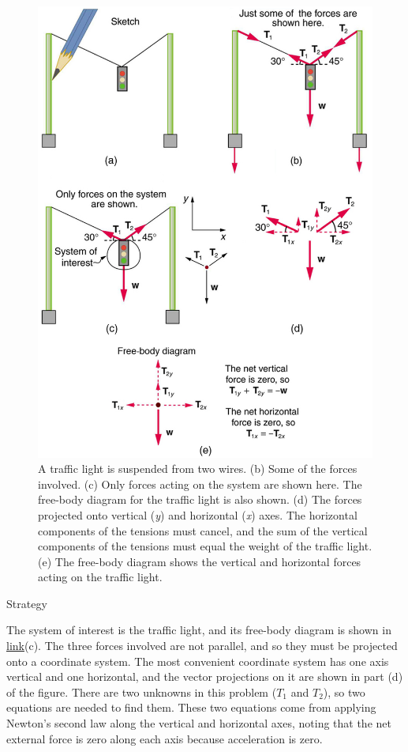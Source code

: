 \documentclass[
]{book}
\begin{document}
\begin{figure}
\hypertarget{import-auto-id3051538}{%
\centering
\includegraphics{images/Figure_04_07_02.jpg}
\caption{A traffic light is suspended from two wires. (b) Some of the forces
involved. (c) Only forces acting on the system are shown here. The
free-body diagram for the traffic light is also shown. (d) The forces
projected onto vertical (\emph{y}) and horizontal (\emph{x}) axes. The horizontal
components of the tensions must cancel, and the sum of the vertical
components of the tensions must equal the weight of the traffic light.
(e) The free-body diagram shows the vertical and horizontal forces
acting on the traffic
light.}\label{import-auto-id3051538}
}
\end{figure}

{Strategy}

The system of interest is the traffic light, and its free-body diagram
is shown in \protect\hyperlink{import-auto-id3051538}{link}(c).
The three forces involved are not parallel, and so they must be
projected onto a coordinate system. The most convenient coordinate
system has one axis vertical and one horizontal, and the vector
projections on it are shown in part (d) of the figure. There are two
unknowns in this problem (\(T_{1}{}\) and \(T_{2}{}\)), so two equations are
needed to find them. These two equations come from applying Newton's
second law along the vertical and horizontal axes, noting that the net
external force is zero along each axis because acceleration is zero.
\end{document}

